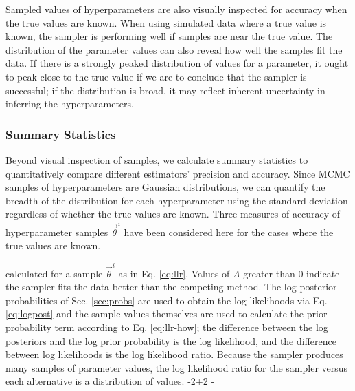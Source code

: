 \documentclass[preprint]{aastex}
\begin{document}
Sampled values of hyperparameters are also visually inspected for accuracy when 
the true values are known.  When using simulated data where a true value is 
known, the sampler is performing well if samples are near the true value.  The 
distribution of the parameter values can also reveal how well the samples fit 
the data.  If there is a strongly peaked distribution of values for a 
parameter, it ought to peak close to the true value if we are to conclude that 
the sampler is successful; if the distribution is broad, it may reflect 
inherent uncertainty in inferring the hyperparameters.

\subsubsection{Summary Statistics}
\label{sec:stats}

Beyond visual inspection of samples, we calculate summary statistics to 
quantitatively compare different estimators' precision and accuracy.  Since 
MCMC samples of hyperparameters are Gaussian distributions, we can quantify the 
breadth of the distribution for each hyperparameter using the standard 
deviation regardless of whether the true values are known.  Three measures of 
accuracy of hyperparameter samples $\vec{\theta}^{i}$  have been considered 
here for the cases where the true values are known.  

calculated for a sample $\vec{\theta}^{i}$ as in Eq. \ref{eq:llr}.  Values of 
$A$ greater than 0 indicate the sampler fits the data better than the competing 
method.  The log posterior probabilities of Sec. \ref{sec:probs} are used to 
obtain the log likelihoods via Eq. \ref{eq:logpost} and the sample values 
themselves are used to calculate the prior probability term according to Eq. 
\ref{eq:llr-how}; the difference between the log posteriors and the log prior 
probability is the log likelihood, and the difference between log likelihoods 
is the log likelihood ratio.  Because the sampler produces many samples of 
parameter values, the log likelihood ratio for the sampler versus each 
alternative is a distribution of values.
%
-2+2%
%
-%
\end{document}
